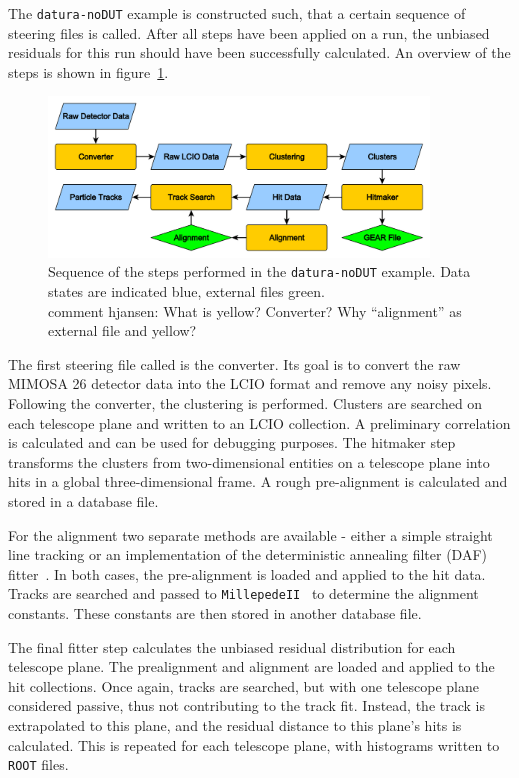 The \texttt{datura-noDUT} example is constructed such, that a certain sequence of steering files is called.
After all steps have been applied on a run, the unbiased residuals for this run should have been successfully calculated.
An overview of the steps is shown in figure~\ref{fig:datura-nodutsequence}.

\begin{figure}[tbp]
  \centering
  \includegraphics[width=0.9\textwidth]{figures/datura-noDUT_paper}
  \caption[Steps performed in the \texttt{datura-noDUT} example]{Sequence of the steps performed in the \texttt{datura-noDUT} example. 
  Data states are indicated blue, external files green. \\comment hjansen: What is yellow? Converter? Why ``alignment'' as external file and yellow?}
  \label{fig:datura-nodutsequence}
\end{figure}

The first steering file called is the converter.
Its goal is to convert the raw MIMOSA 26 detector data into the LCIO format and remove any noisy pixels.
Following the converter, the clustering is performed.
Clusters are searched on each telescope plane and written to an LCIO collection.
A preliminary correlation is calculated and can be used for debugging purposes.
The hitmaker step transforms the clusters from two-dimensional entities on a telescope plane into hits in a global three-dimensional frame.
A rough pre-alignment is calculated and stored in a database file.

For the alignment two separate methods are available - either a simple straight line tracking or an implementation of the deterministic annealing filter (DAF) fitter~\cite{ref:daffitter}.
In both cases, the pre-alignment is loaded and applied to the hit data.
Tracks are searched and passed to \texttt{MillepedeII}~\cite{Blobel-2006} to determine the alignment constants.
These constants are then stored in another database file.

The final fitter step calculates the unbiased residual distribution for each telescope plane.
The prealignment and alignment are loaded and applied to the hit collections.
Once again, tracks are searched, but with one telescope plane considered passive, thus not contributing to the track fit.
Instead, the track is extrapolated to this plane, and the residual distance to this plane's hits is calculated.
This is repeated for each telescope plane, with histograms written to \texttt{ROOT} files.


